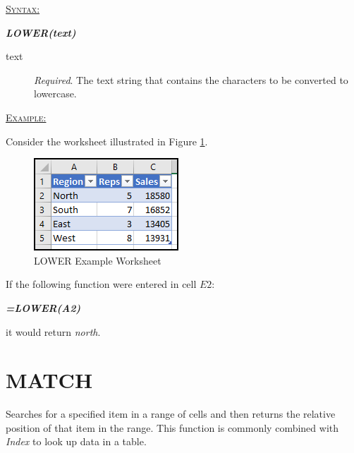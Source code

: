 \begin{addmargin}[1cm]{0cm}
	
	\medskip
	\underline{\textsc{Syntax:}}
	\medskip
	
	{\color{Syntax}
		\noindent\textbf{\textit{LOWER(text)}}
	}
	
	\begin{description}
		\item[text] \textit{Required}. The text string that contains the characters to be converted to lowercase.
	\end{description}

	\medskip
	\noindent\underline{\textsc{Example:}}
	\medskip
	
	\noindent Consider the worksheet illustrated in Figure \ref{apa:low}.
	
	\begin{figure}[H]
		\centering
		\includegraphics[width=\maxwidth{.45\linewidth}]{gfx/apa_fig01}
		\caption{LOWER Example Worksheet}
		\label{apa:low}
	\end{figure}
	
	\noindent If the following function were entered in cell $ E2 $:
	
	{\color{Syntax}
		\textit{\textbf{=LOWER(A2)}}
	}
	
	\noindent it would return \textit{north}.

\end{addmargin}

\section{MATCH}

Searches for a specified item in a range of cells and then returns the relative position of that item in the range. This function is commonly combined with \textit{Index} to look up data in a table.

